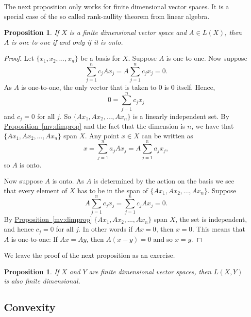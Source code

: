 \documentclass[12pt]{book}
\theoremstyle{plain}
\newtheorem{prop}[thm]{Proposition}
\theoremstyle{remark}
\theoremstyle{definition}
\theoremstyle{exercise}
\theoremstyle{example}
\newcommand{\propref}[1]{\hyperref[#1]{Proposition~\ref*{#1}}}
\begin{document}
The next proposition only works for finite dimensional vector spaces.
It is a special case of the so called rank-nullity theorem from linear
algebra.

\begin{prop} \label{mv:prop:lin11onto}
If $X$ is a finite dimensional vector space and $A \in L(X)$, then $A$ is one-to-one if and only if it is onto.
\end{prop}

\begin{proof}
Let $\{ x_1,x_2,\ldots,x_n \}$ be a basis for $X$.
Suppose $A$ is one-to-one.  Now suppose
\begin{equation*}
\sum_{j=1}^n c_j Ax_j =
A\sum_{j=1}^n c_j x_j =
0 .
\end{equation*}
As $A$ is one-to-one,
the only vector that is taken to 0 is 0 itself.  
Hence,
\begin{equation*}
0 =
\sum_{j=1}^n c_j x_j
\end{equation*}
and $c_j = 0$ for all $j$.
So $\{ Ax_1, Ax_2, \ldots, Ax_n \}$ is a linearly independent set.
By \propref{mv:dimprop}
and the fact that the dimension is $n$, we have that
$\{ Ax_1, Ax_2, \ldots, Ax_n \}$ span $X$.  Any point $x \in X$
can be written as
\begin{equation*}
x = \sum_{j=1}^n a_j Ax_j =
A\sum_{j=1}^n a_j x_j ,
\end{equation*}
so $A$ is onto.

Now suppose $A$ is onto.  As $A$ is determined by the action on
the basis we see that every element of $X$ has to be in the span of
$\{ Ax_1, Ax_2, \ldots, Ax_n \}$.  Suppose 
\begin{equation*}
A\sum_{j=1}^n c_j x_j =
\sum_{j=1}^n c_j Ax_j = 0 .
\end{equation*}
By \propref{mv:dimprop}
$\{ Ax_1, Ax_2, \ldots, Ax_n \}$ span $X$, the set is independent,
and hence $c_j = 0$ for all $j$.  In other words if $Ax = 0$, then $x=0$.  This means that
$A$ is one-to-one:  If $Ax = Ay$, then $A(x-y) = 0$ and so
$x=y$.
\end{proof}

We leave the proof of the next proposition as an exercise.

\begin{prop} \label{prop:LXYfinitedim}
If $X$ and $Y$ are finite dimensional vector spaces, then $L(X,Y)$
is also finite dimensional.
\end{prop}

\subsection{Convexity}
\end{document}
